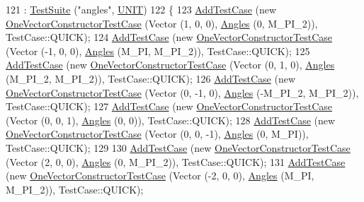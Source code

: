 \begin{DoxyCode}
121   : \hyperlink{classns3_1_1TestSuite_a904b0c40583b744d30908aeb94636d1a}{TestSuite} (\textcolor{stringliteral}{"angles"}, \hyperlink{classns3_1_1TestSuite_a1ebfcab34ec8161e085e8e3a1855eae0a3885375a3787abf60431f8454b3cadbd}{UNIT})
122 \{
123   \hyperlink{classns3_1_1TestCase_a3718088e3eefd5d6454569d2e0ddd835}{AddTestCase} (\textcolor{keyword}{new} \hyperlink{classOneVectorConstructorTestCase}{OneVectorConstructorTestCase} (Vector (1, 0, 0),  
         \hyperlink{structns3_1_1Angles}{Angles} (0, M\_PI\_2)), TestCase::QUICK);
124   \hyperlink{classns3_1_1TestCase_a3718088e3eefd5d6454569d2e0ddd835}{AddTestCase} (\textcolor{keyword}{new} \hyperlink{classOneVectorConstructorTestCase}{OneVectorConstructorTestCase} (Vector (-1, 0, 0), 
         \hyperlink{structns3_1_1Angles}{Angles} (M\_PI, M\_PI\_2)), TestCase::QUICK);
125   \hyperlink{classns3_1_1TestCase_a3718088e3eefd5d6454569d2e0ddd835}{AddTestCase} (\textcolor{keyword}{new} \hyperlink{classOneVectorConstructorTestCase}{OneVectorConstructorTestCase} (Vector (0, 1, 0),  
         \hyperlink{structns3_1_1Angles}{Angles} (M\_PI\_2, M\_PI\_2)), TestCase::QUICK);
126   \hyperlink{classns3_1_1TestCase_a3718088e3eefd5d6454569d2e0ddd835}{AddTestCase} (\textcolor{keyword}{new} \hyperlink{classOneVectorConstructorTestCase}{OneVectorConstructorTestCase} (Vector (0, -1, 0), 
         \hyperlink{structns3_1_1Angles}{Angles} (-M\_PI\_2, M\_PI\_2)), TestCase::QUICK);
127   \hyperlink{classns3_1_1TestCase_a3718088e3eefd5d6454569d2e0ddd835}{AddTestCase} (\textcolor{keyword}{new} \hyperlink{classOneVectorConstructorTestCase}{OneVectorConstructorTestCase} (Vector (0, 0, 1),  
         \hyperlink{structns3_1_1Angles}{Angles} (0, 0)), TestCase::QUICK);
128   \hyperlink{classns3_1_1TestCase_a3718088e3eefd5d6454569d2e0ddd835}{AddTestCase} (\textcolor{keyword}{new} \hyperlink{classOneVectorConstructorTestCase}{OneVectorConstructorTestCase} (Vector (0, 0, -1), 
         \hyperlink{structns3_1_1Angles}{Angles} (0, M\_PI)), TestCase::QUICK);
129 
130   \hyperlink{classns3_1_1TestCase_a3718088e3eefd5d6454569d2e0ddd835}{AddTestCase} (\textcolor{keyword}{new} \hyperlink{classOneVectorConstructorTestCase}{OneVectorConstructorTestCase} (Vector (2, 0, 0),  
         \hyperlink{structns3_1_1Angles}{Angles} (0, M\_PI\_2)), TestCase::QUICK);
131   \hyperlink{classns3_1_1TestCase_a3718088e3eefd5d6454569d2e0ddd835}{AddTestCase} (\textcolor{keyword}{new} \hyperlink{classOneVectorConstructorTestCase}{OneVectorConstructorTestCase} (Vector (-2, 0, 0), 
         \hyperlink{structns3_1_1Angles}{Angles} (M\_PI, M\_PI\_2)), TestCase::QUICK);

\end{DoxyCode}
